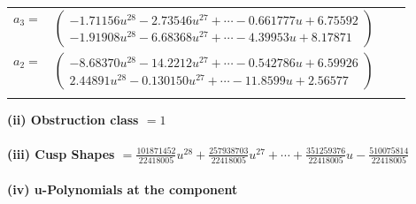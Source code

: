 \documentclass[1p]{elsarticle_modified}
\theoremstyle{definition}
\begin{document}
\begin{tabular}{m{7pt} m{180pt} m{7pt} m{180pt} }
\flushright $a_{3}=$&$\begin{pmatrix}-1.71156 u^{28}-2.73546 u^{27}+\cdots-0.661777 u+6.75592\\-1.91908 u^{28}-6.68368 u^{27}+\cdots-4.39953 u+8.17871\end{pmatrix}$ \\
\flushright $a_{2}=$&$\begin{pmatrix}-8.68370 u^{28}-14.2212 u^{27}+\cdots-0.542786 u+6.59926\\2.44891 u^{28}-0.130150 u^{27}+\cdots-11.8599 u+2.56577\end{pmatrix}$\\&\end{tabular}
\flushleft \textbf{(ii) Obstruction class $= 1$}\\~\\
\flushleft \textbf{(iii) Cusp Shapes $= \frac{101871452}{22418005} u^{28}+\frac{257938703}{22418005} u^{27}+\cdots+\frac{351259376}{22418005} u-\frac{510075814}{22418005}$}\\~\\
\newpage\renewcommand{\arraystretch}{1}
\flushleft \textbf{(iv) u-Polynomials at the component}\newline \\
\end{document}

